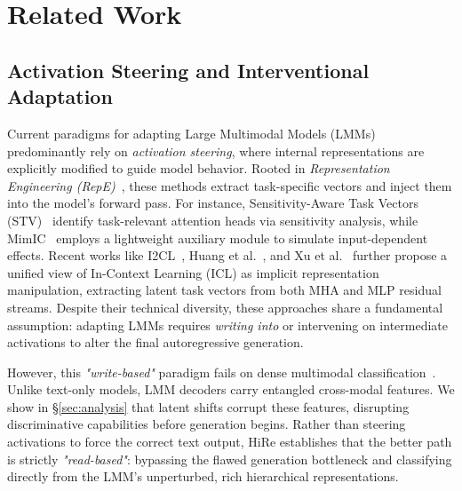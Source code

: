 \documentclass[sigconf,review,anonymous,9pt,table]{acmart}
\begin{document}
\section{Related Work}


\subsection{Activation Steering and Interventional Adaptation}

Current paradigms for adapting Large Multimodal Models (LMMs) predominantly rely on \textit{activation steering}, where internal representations are explicitly modified to guide model behavior. Rooted in \textit{Representation Engineering (RepE)}~\cite{zou2023representation, dafnis2025test}, these methods extract task-specific vectors and inject them into the model's forward pass.
For instance, Sensitivity-Aware Task Vectors (STV)~\cite{ma2026and} identify task-relevant attention heads via sensitivity analysis, while MimIC~\cite{jiang2025mimic} employs a lightweight auxiliary module to simulate input-dependent effects.
Recent works like I2CL~\cite{li2025implicit}, Huang et al.~\cite{huang2024multimodal}, and Xu et al.~\cite{xu2026steering} further propose a unified view of In-Context Learning (ICL) as implicit representation manipulation, extracting latent task vectors from both MHA and MLP residual streams.
Despite their technical diversity, these approaches share a fundamental assumption: adapting LMMs requires \textit{writing into} or intervening on intermediate activations to alter the final autoregressive generation.

However, this \textit{"write-based"} paradigm fails on dense multimodal classification~\cite{doveh2024towards}. Unlike text-only models, LMM decoders carry entangled cross-modal features. We show in \S\ref{sec:analysis} that latent shifts corrupt these features, disrupting discriminative capabilities before generation begins.
Rather than steering activations to force the correct text output, HiRe establishes that the better path is strictly \textit{"read-based"}: bypassing the flawed generation bottleneck and classifying directly from the LMM's unperturbed, rich hierarchical representations.
\end{document}
